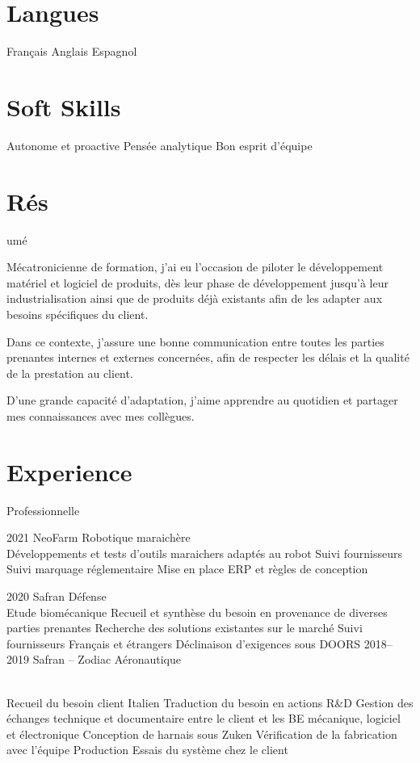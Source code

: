 \documentclass{cv-style}     %
\begin{document}
\begin{aside}
    \section{Langues}
    Français 
    Anglais 
    Espagnol
    \section{Soft Skills}
    Autonome et proactive
    Pensée analytique
    Bon esprit d'équipe
\end{aside}

\section{Rés}{umé}

Mécatronicienne de formation, j’ai eu l’occasion de piloter le développement matériel et logiciel de produits, dès leur phase de développement jusqu'à leur industrialisation ainsi que de produits déjà existants afin de les adapter aux besoins spécifiques du client.
 
Dans ce contexte, j'assure une bonne communication entre toutes les parties prenantes internes et externes concernées, afin de respecter les délais et la qualité de la prestation au client.
 
D'une grande capacité d'adaptation, j’aime apprendre au quotidien et partager mes connaissances avec mes collègues.


\section{Experience}{ Professionnelle}

\begin{entrylist}
\entry
  {2021}
  {NeoFarm}
  {Robotique maraichère}
  {\\
   Développements et tests d'outils maraichers adaptés au robot
   Suivi fournisseurs
   Suivi marquage réglementaire
   Mise en place ERP et règles de conception}
 
\entry
  {2020}
  {Safran}
  {Défense}
  {\\
  Etude biomécanique
  Recueil et synthèse du besoin en provenance de diverses parties prenantes
  Recherche des solutions existantes sur le marché
  Suivi fournisseurs Français et étrangers
  Déclinaison d’exigences sous DOORS 
  }
\entry
  {2018--2019}
  {Safran -- Zodiac}
  {Aéronautique}
  {\\
  Recueil du besoin client Italien
  Traduction du besoin en actions R\&D
  Gestion des échanges technique et documentaire entre le client et les BE mécanique, logiciel et électronique
  Conception de harnais sous Zuken
  Vérification de la fabrication avec l'équipe Production
  Essais du système chez le client
 
  }
\end{entrylist}
\end{document}
